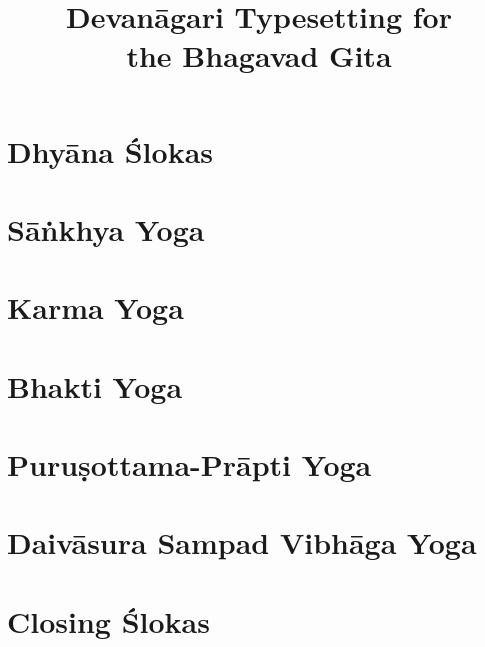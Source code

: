 \documentclass{scrbook}
\title{Devanāgari Typesetting for \\ the Bhagavad Gita}
\author{}
\begin{document}
\maketitle
\frontmatter

\tableofcontents
\newpage

\chapter{Dhyāna Ślokas}


\mainmatter
\setcounter{chapter}{1}

\chapter{Sāṅkhya Yoga}
\begin{multicols}{2}
    
\end{multicols}

\chapter{Karma Yoga}
\begin{multicols}{2}
    
\end{multicols}

\setcounter{chapter}{11}

\chapter{Bhakti Yoga}
\begin{multicols}{2}
    
\end{multicols}

\setcounter{chapter}{14}

\chapter{Puruṣottama-Prāpti Yoga}
\begin{multicols}{2}
    
\end{multicols}

\chapter{Daivāsura Sampad Vibhāga Yoga}
\begin{multicols}{2}
    
\end{multicols}

\backmatter
\chapter{Closing Ślokas}

\end{document}
